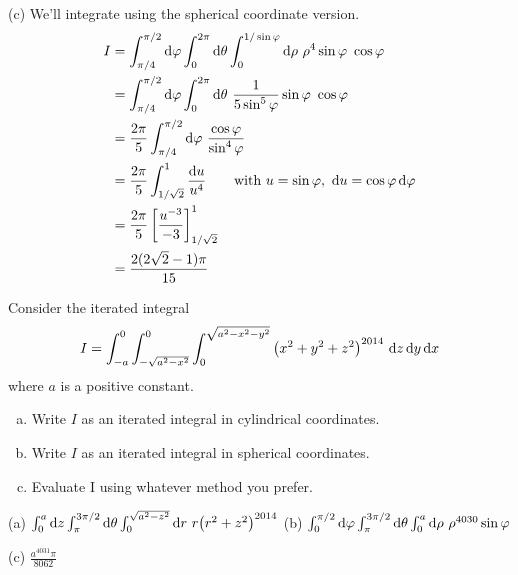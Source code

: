 \begin{solution}
(c) We'll integrate using the spherical coordinate version.
\begin{align*}
I &= \int_{\pi/4}^{\pi/2}\dee{\varphi} 
                \int_0^{2\pi}\dee{\theta} 
                \int_0^{1/\sin\varphi}\dee{\rho}\ 
                \rho^4\sin\varphi \ \cos\varphi \\
  &= \int_{\pi/4}^{\pi/2}\dee{\varphi} 
                \int_0^{2\pi}\dee{\theta}\ 
                \frac{1}{5\sin^5\varphi}\sin\varphi \ \cos\varphi \\
  &= \frac{2\pi}{5}\int_{\pi/4}^{\pi/2}\dee{\varphi}\ 
                \frac{\cos\varphi}{\sin^4\varphi} \\
  &= \frac{2\pi}{5}\int_{1/\sqrt{2}}^{1} 
                \frac{\dee{u}}{u^4}\qquad\text{with }
                     u=\sin\varphi,\ \dee{u}=\cos\varphi\,\dee{\varphi} \\
  &= \frac{2\pi}{5} \left[\frac{u^{-3}}{-3}\right]_{1/\sqrt{2}}^{1}  \\
  &= \frac{2(2\sqrt{2}-1)\pi}{15}
\end{align*} 
\end{solution}

\begin{question}[M200 2014D] %
Consider the iterated integral
\begin{equation*}
I =\int_{-a}^0\int_{-\sqrt{a^2-x^2}}^0 \int_0^{\sqrt{a^2-x^2-y^2}}
    \big(x^2+y^2+z^2\big)^{2014}\ \mathrm{d}z\,\mathrm{d}y\,\mathrm{d}x
\end{equation*}
where $a$ is a positive constant.
\begin{enumerate}[(a)]
\item
Write $I$ as an iterated integral in cylindrical coordinates.
\item
Write $I$ as an iterated integral in spherical coordinates.
\item
Evaluate I using whatever method you prefer.
\end{enumerate}
\end{question}

%

\begin{answer}
(a) $\int_0^a \mathrm{d}z\int_{\pi}^{3\pi/2}\mathrm{d}\theta 
      \int_0^{\sqrt{a^2-z^2}}\mathrm{d}r\ r\big(r^2+z^2\big)^{2014}$\qquad
(b) $\int_0^{\pi/2} \mathrm{d}\varphi\int_{\pi}^{3\pi/2}\mathrm{d}\theta 
     \int_0^a\mathrm{d}\rho\ \rho^{4030}\sin\varphi$

(c) $\frac{a^{4031}\pi}{8062}$
\end{answer}

